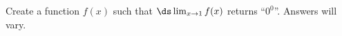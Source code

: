 {Create a function $f(x)$ such that $\ds \lim_{x\to 1}f(x)$ returns ``$0^0$''.}
{Answers will vary.}
